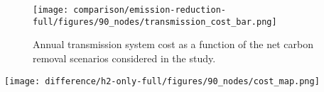 \documentclass[twocolumn]{article}
\newcommand{\hydrogen}{H$_2$}
\newcommand{\hydrogengrid}{\hydrogen{}--Grid}
\begin{document}
\begin{figure}[ht]
    \centering
    \texttt{[image: comparison/emission-reduction-full/figures/90\_nodes/transmission\_cost\_bar.png]}
    \caption{Annual transmission system cost as a function of the net carbon removal scenarios considered in the study.}
    \label{fig:transmission_cost_bar}
\end{figure}


\begin{figure*}[ht]
    \centering
    \texttt{[image: difference/h2-only-full/figures/90\_nodes/cost\_map.png]}
    \caption{Difference in cost investments between \hydrogengrid and Hybrid model. The left subfigure shows higher spendings per technology and region and transport system for the \hydrogengrid model, the right shows higher spendings in the Hydrid model.}
    \label{fig:cost_map_difference}
\end{figure*}
\end{document}
